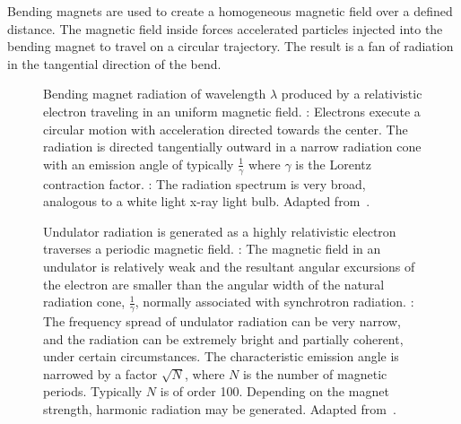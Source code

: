 Bending magnets are used to create a homogeneous magnetic field over a defined distance. The magnetic field inside forces accelerated particles injected into the bending magnet to travel on a circular trajectory. The result is a fan of radiation in the tangential direction of the bend.

\begin{figure}%
	\noindent{}
	\caption[Bending magnet radiation]{Bending magnet radiation of wavelength $\lambda$ produced by a relativistic electron traveling in an uniform magnetic field. %
		: Electrons execute a circular motion with acceleration directed towards the center. The radiation is directed tangentially outward in a narrow radiation cone with an emission angle of typically $\frac{1}{\gamma}$ where $\gamma$ is the Lorentz contraction factor. %
		: The radiation spectrum is very broad, analogous to a white light x-ray light bulb.%
		Adapted from~\cite{Attwood2007}.}%
	\label{fig:bending magnets}
\end{figure}%

\begin{figure}%
	\noindent{}
	\caption[Undulator radiation]{Undulator radiation is generated as a highly relativistic electron traverses a periodic magnetic field.%
		: The magnetic field in an undulator is relatively weak and the resultant angular excursions of the electron are smaller than the angular width of the natural radiation cone, $\frac{1}{\gamma}$, normally associated with synchrotron radiation.%
		: The frequency spread of undulator radiation can be very narrow, and the radiation can be extremely bright and partially coherent, under certain circumstances. The characteristic emission angle is narrowed by a factor $\sqrt N$, where $N$ is the number of magnetic periods. Typically $N$ is of order 100. Depending on the magnet strength, harmonic radiation may be generated. Adapted from~\cite{Attwood2007}.}%
	\label{fig:undulator}%
\end{figure}

